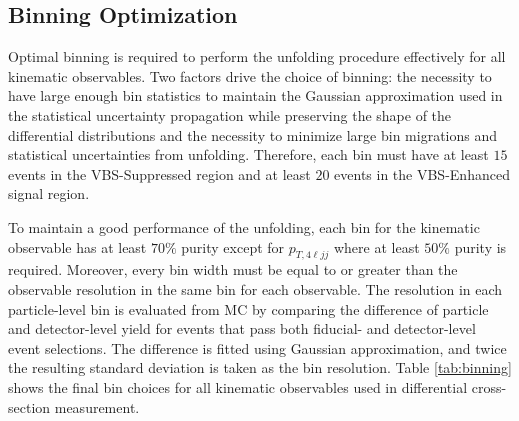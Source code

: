 \subsection{Binning Optimization}
\label{subsec:Binning}
Optimal binning is required to perform the unfolding procedure effectively for all kinematic observables. Two factors drive the choice of binning: the necessity to have large enough bin statistics to maintain the Gaussian approximation used in the statistical uncertainty propagation while preserving the shape of the differential distributions and the necessity to minimize large bin migrations and statistical uncertainties from unfolding. Therefore, each bin must have at least $15$ events in the VBS-Suppressed region and at least $20$ events in the VBS-Enhanced signal region. 

To maintain a good performance of the unfolding, each bin for the kinematic observable has at least $70\%$ purity except for $p_{T,4\ell jj}$ where at least $50\%$ purity is required. Moreover, every bin width must be equal to or greater than the observable resolution in the same bin for each observable. The resolution in each particle-level bin is evaluated from MC by comparing the difference of particle and detector-level yield for events that pass both fiducial- and detector-level event selections. The difference is fitted using Gaussian approximation, and twice the resulting standard deviation is taken as the bin resolution. Table \ref{tab:binning} shows the final bin choices for all kinematic observables used in differential cross-section measurement.

